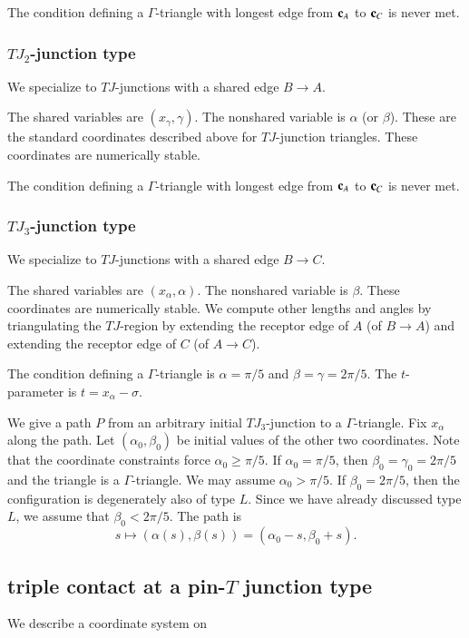 The condition defining a $\Gamma$-triangle with longest edge from
${\mathbf c}_A$ to ${\mathbf c}_C$ is never met.

\subsubsection{$TJ_2$-junction type}

We specialize to $TJ$-junctions with a shared edge $B\to A$.

The shared variables are $(x_\gamma,\gamma)$.  The nonshared variable
is $\alpha$ (or $\beta$).  These are the standard coordinates
described above for $TJ$-junction triangles.  These coordinates are
numerically stable.

The condition defining a $\Gamma$-triangle with longest edge from
${\mathbf c}_A$ to ${\mathbf c}_C$ is never met.

\subsubsection{$TJ_3$-junction type}

We specialize to $TJ$-junctions with a shared edge $B\to C$.

The shared variables are $(x_\alpha,\alpha)$.  The nonshared variable
is $\beta$.  These coordinates are numerically stable.  We compute
other lengths and angles by triangulating the $TJ$-region by extending
the receptor edge of $A$ (of $B\to A$) and extending the receptor edge
of $C$ (of $A\to C$).

The condition defining a $\Gamma$-triangle is $\alpha=\pi/5$ and
$\beta=\gamma=2\pi/5$.  The $t$-parameter is $t =x_\alpha - \sigma$.

We give a path $P$ from an arbitrary initial $TJ_3$-junction to a
$\Gamma$-triangle.  Fix $x_\alpha$ along the path.  Let
$(\alpha_0,\beta_0)$ be initial values of the other two coordinates.
Note that the coordinate constraints force $\alpha_0\ge \pi/5$. If
$\alpha_0=\pi/5$, then $\beta_0=\gamma_0=2\pi/5$ and the triangle is a
$\Gamma$-triangle.  We may assume $\alpha_0 > \pi/5$.  If
$\beta_0=2\pi/5$, then the configuration is degenerately also of type
$L$.  Since we have already discussed type $L$, we assume that
$\beta_0<2\pi/5$.  The path is
\[
s\mapsto (\alpha(s),\beta(s)) = (\alpha_0 - s,\beta_0+s).
\]


\subsection{triple contact at a pin-$T$ junction type}
We describe a coordinate system on

